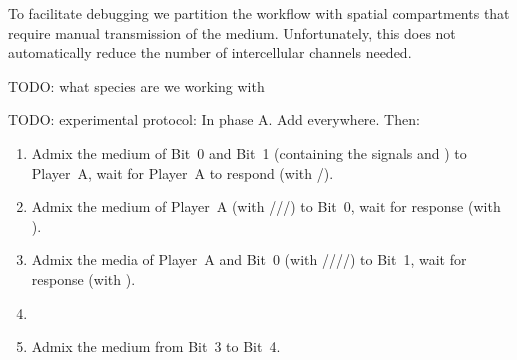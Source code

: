 \documentclass[12pt,notitlepage]{article}
\newcommand{\TODO}[1]{\textrm{\color{red}TODO: #1}}
\newcommand{\ra}[1]{{\color{Blue}#1}}
\begin{document}



%

\ra{
To facilitate debugging
we partition the workflow
with spatial compartments
that require manual transmission of 
the medium.
%
Unfortunately, this does not automatically reduce
the number of intercellular channels needed.
}


\TODO{what species are we working with}


\TODO{experimental protocol:}
%
In phase A.
%
Add  everywhere.
%
Then:
%
\begin{enumerate}
\item 
    Admix the medium of Bit~0 and Bit~1 
    (containing the signals  and )
    to Player~A,
    wait for Player~A to respond
    (with /).
    
\item
    Admix the medium of Player~A
    (with ///)
    to Bit~0, wait for response
    (with ).
    
\item
    Admix the media of Player~A and Bit~0
    (with ////)
    to Bit~1, wait for response
    (with ). 
    
\item
    
\item
    Admix the medium from Bit~3 to Bit~4.
    
\end{enumerate}
\end{document}
